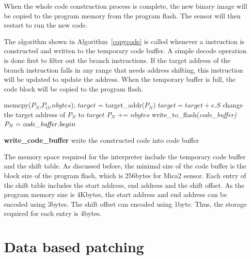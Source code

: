 When the whole code construction process is complete, the new binary image
will be copied to the program memory from the program flash. The sensor will
then restart to run the new code.




The algorithm shown in Algorithm~\ref{copycode} is called whenever a 
instruction is constructed and written to the temporary code buffer.
A simple decode operation is done first to filter out the branch instructions.
If the target address of the branch instruction falls in any range that needs address
shifting, this instruction will be updated to update the address.
When the temporary buffer is full, the code block will be copied to the
program flash.


\begin{algorithm}
\singlespace
\begin{algorithmic}[1]
\singlespace
{}
\STATE memcpy($P_N$,$P_O$,$nbytes$);
		\STATE $target$ = target\_addr($P_N$)
			\STATE $target = target+e.S$
			\STATE change the target address of $P_N$ to $target$
		\ENDIF
	\ENDIF	
\ENDFOR
\STATE $P_N$ += $nbytes$
	\STATE write\_to\_flash(\it code\_buffer)
	\STATE $P_N = {{\it code\_buffer}}.begin$
\ENDIF
\end{algorithmic}
\caption{{\bf write\_code\_buffer} \/\/write the constructed code into code buffer}
\label{copycode}
\end{algorithm}

The memory space required for the interpreter include the temporary code buffer
and the shift table. As discussed before, the minimal size of the code buffer is the block
size of the program flash, which is 256bytes for Mica2 sensor.
Each entry of the shift table includes the start address, end address and the shift offset.
As the program memory size is 4Kbytes, the start address and end address can be
encoded using 3bytes. The shift offset can encoded using 1byte. Thus, the storage
required for each entry is 4bytes.


\section{Data based patching}



